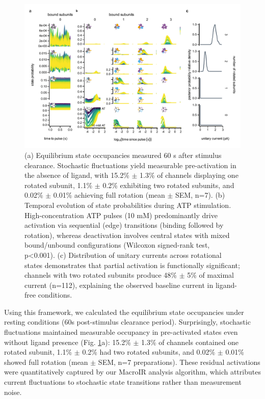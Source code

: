 \documentclass[pdflatex,sn-nature]{sn-jnl}%
\theoremstyle{thmstyleone}%
\theoremstyle{thmstyletwo}%
\theoremstyle{thmstylethree}%
\begin{document}
\begin{figure}[t]
	\centering
	\includegraphics[width=\linewidth]{Figure_5_states.pdf}
	\caption{(a) Equilibrium state occupancies measured 60 s after stimulus clearance. Stochastic fluctuations yield measurable pre-activation in the absence of ligand, with 15.2\% $\pm$ 1.3\% of channels displaying one rotated subunit, 1.1\% $\pm$ 0.2\% exhibiting two rotated subunits, and 0.02\% $\pm$ 0.01\% achieving full rotation (mean $\pm$ SEM, n=7). (b) Temporal evolution of state probabilities during ATP stimulation. High-concentration ATP pulses (10 mM) predominantly drive activation via sequential (edge) transitions (binding followed by rotation), whereas deactivation involves central states with mixed bound/unbound configurations (Wilcoxon signed-rank test, p<0.001). (c) Distribution of unitary currents across rotational states demonstrates that partial activation is functionally significant; channels with two rotated subunits produce 48\% $\pm$ 5\% of maximal current (n=112), explaining the observed baseline current in ligand-free conditions.}
	\label{fig:SchemeX_states}
\end{figure}


Using this framework, we calculated the equilibrium state occupancies under resting conditions (60s post-stimulus clearance period). Surprisingly, stochastic fluctuations maintained measurable occupancy in pre-activated states even without ligand presence (Fig. \ref{fig:SchemeX_states}a): 15.2\% $\pm$ 1.3\% of channels contained one rotated subunit, 1.1\% $\pm$ 0.2\% had two rotated subunits, and 0.02\% $\pm$ 0.01\% showed full rotation (mean $\pm$ SEM, n=7 preparations). These residual activations were quantitatively captured by our MacroIR analysis algorithm, which attributes current fluctuations to stochastic state transitions rather than measurement noise.
\end{document}
